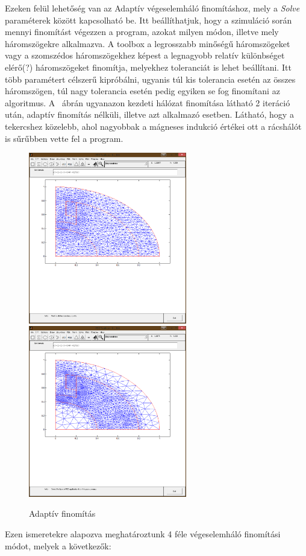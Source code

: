 Ezeken felül lehetőség van az Adaptív végeselemháló finomításhoz, mely a \textit{Solve} paraméterek között kapcsolható be. Itt beállíthatjuk, hogy a szimuláció során mennyi finomítást végezzen a program, azokat milyen módon, illetve mely háromszögekre alkalmazva. A toolbox a legrosszabb minőségű háromszögeket vagy a szomszédos háromszögekhez képest a legnagyobb relatív különbséget elérő(?) háromszögeket finomítja, melyekhez toleranciát is lehet beállítani. Itt több paramétert célszerű kipróbálni, ugyanis túl kis tolerancia esetén az összes háromszögen, túl nagy tolerancia esetén pedig egyiken se fog finomítani az algoritmus. A ~ábrán ugyanazon kezdeti hálózat finomítása látható 2 iteráció után, adaptív finomítás nélküli, illetve azt alkalmazó esetben. Látható, hogy a tekercshez közelebb, ahol nagyobbak a mágneses indukció értékei ott a rácshálót is sűrűbben vette fel a program.


\begin{figure}[!h]
	\centering
	\includegraphics[trim = 15mm 80mm 10mm 40mm,clip, width=69mm, keepaspectratio]{figures/terek/mesh1.png}\hspace{5mm}
	\includegraphics[trim = 15mm 80mm 10mm 40mm,clip, width=69mm, keepaspectratio]{figures/terek/mesh2.png}
	\caption{Adaptív finomítás}
	\label{fig:adaptive}
\end{figure}
\newpage
Ezen ismeretekre alapozva meghatároztunk 4 féle végeselemháló finomítási módot, melyek a következők:


